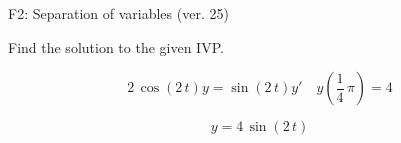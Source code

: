 \begin{exercise}
  \begin{exerciseTitle}F2: Separation of variables (ver. 25)\end{exerciseTitle}
  \begin{exerciseStatement}
    
Find the solution to the given IVP.

    
\[2 \, \cos\left(2 \, t\right) y= \sin\left(2 \, t\right) y'\hspace{1em} y\left( \frac{1}{4} \, \pi \right)= 4\]

  \end{exerciseStatement}
  \begin{exerciseAnswer}
    
\[y= 4 \, \sin\left(2 \, t\right)\]

  \end{exerciseAnswer}
\end{exercise}